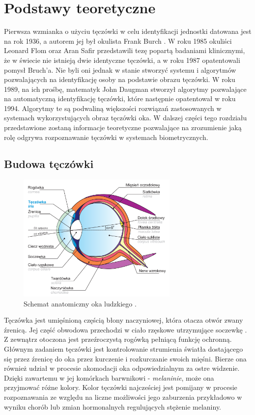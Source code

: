 \chapter{Podstawy teoretyczne}

Pierwsza wzmianka o użyciu tęczówki w celu identyfikacji jednostki datowana jest na rok
1936, a autorem jej był okulista Frank Burch \cite{FBIGov}. W roku 1985 okuliści Leonard Flom oraz
Aran Safir przedstawili tezę popartą badaniami klinicznymi, że w świecie nie istnieją dwie
identyczne tęczówki, a w roku 1987 opatentowali pomysł Bruch'a. Nie byli oni jednak w
stanie stworzy\'c systemu i algorytmów pozwalających na identyfikację osoby na podstawie
obrazu tęczówki. W roku 1989, na ich prośbę, matematyk John Daugman stworzył algorytmy
pozwalające na automatyczną identyfikację tęczówki, które następnie opatentował w roku 1994.
\cite{Misztal2012}
Algorytmy te są podwaliną większości rozwiąza\'n zastosowanych w systemach wykorzystujących
obraz tęczówki oka. W dalszej części tego rozdziału przedstawione zostaną informacje teoretyczne
pozwalające na zrozumienie jaką rolę odgrywa rozpoznawanie tęczówki w systemach biometrycznych.

\section{Budowa tęczówki}

\begin{figure}[ht]
  \centering
  \includegraphics[width=0.7\textwidth]{images/intro/eyeStructure.png}
  \caption{Schemat anatomiczny oka ludzkiego \cite{Czajka}.}
  \label{fig:eyeStructure}
\end{figure}

Tęczówka jest umięśnioną częścią błony naczyniowej, która otacza otwór zwany \'zrenicą.
Jej częś\'c obwodowa przechodzi w ciało rzęskowe utrzymujące soczewkę \cite{Czajka}. Z zewnątrz
otoczona jest prze\'zroczystą rogówką pełniącą funkcję ochronną. Głównym zadaniem tęczówki
jest kontrolowanie strumienia światła dostającego się przez \'zrenicę do oka przez kurczenie i
rozkurczanie swoich mięśni. Bierze ona również udział w procesie akomodacji oka odpowiedzialnym
za ostre widzenie. Dzięki zawartemu w jej komórkach barwnikowi - \textit{melaninie}, może ona przyjmowa\'c różne kolory.
Kolor tęczówki najcześciej jest pomijany w procesie rozpoznawania ze względu na liczne możliwości
jego zaburzenia przykładowo w wyniku chorób lub zmian hormonalnych regulujących stężenie melaniny.

